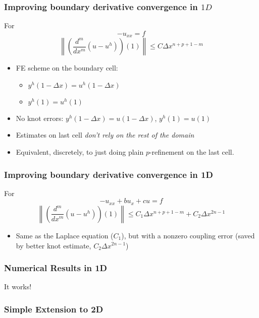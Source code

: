 \begin{frame}
    \frametitle{Improving boundary derivative convergence in \(1D\)}
    For
    \begin{equation*}
        -u_{xx} = f
    \end{equation*}
    \pause
    \begin{equation}
        \left\|(\dfrac{d^m}{dx^m}(u - u^h))(1)\right\|
        \leq C \Delta x^{n + p + 1 - m}
    \end{equation}
    \pause
    \begin{itemize}
        \item FE scheme on the boundary cell:
              \begin{itemize}
                  \item \(y^h(1 - \Delta x) = u^h(1 - \Delta x)\)
                  \item \(y^h(1) = u^h(1)\)
              \end{itemize}
              \pause
        \item No knot errors: \(y^h(1 - \Delta x) = u(1 - \Delta x)\),
              \(y^h(1) = u(1)\)
        \item Estimates on last cell \emph{don't rely on the rest of the
              domain}
        \item Equivalent, discretely, to just doing plain \(p\)-refinement on
              the last cell.
    \end{itemize}
\end{frame}

\begin{frame}
    \frametitle{Improving boundary derivative convergence in 1D}
    For
    \begin{equation*}
        -u_{xx} + b u_x + c u = f
    \end{equation*}
    \pause
    \begin{equation}
        \left\|(\dfrac{d^m}{dx^m}(u - u^h))(1)\right\|
        \leq C_1 \Delta x^{n + p + 1 - m}
        + C_2 \Delta x^{2 n - 1}

    \end{equation}
    \pause
    \begin{itemize}
        \item Same as the Laplace equation (\(C_1\)), but with a nonzero coupling error
              (saved by better knot estimate, \(C_2 \Delta x^{2 n - 1}\))
    \end{itemize}
\end{frame}

\begin{frame}
    \frametitle{Numerical Results in 1D}
    It works!
\end{frame}

\begin{frame}
    \frametitle{Simple Extension to 2D}
\end{frame}
